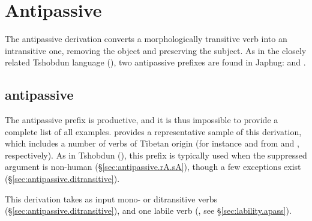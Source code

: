 \section{Antipassive} \label{sec:antipassive}
The antipassive derivation converts a morphologically transitive verb into an intransitive one, removing the object and preserving the subject. As in the closely related Tshobdun language (\citealt[8]{jackson06paisheng}), two antipassive prefixes are found in Japhug:  and .


\subsection{ antipassive} \label{sec:antipassive.rA}
The  antipassive prefix is productive, and it is thus impossible to provide a complete list of all examples.  provides a representative sample of this derivation, which includes a number of verbs of Tibetan origin (for instance  and  from  and , respectively). As in Tshobdun (\citealt[8]{jackson06paisheng}), this prefix is typically used when the suppressed argument is non-human (§\ref{sec:antipassive.rA.sA}), though a few exceptions exist (§\ref{sec:antipassive.ditransitive}). 
 
 This derivation takes as input mono- or ditransitive verbs (§\ref{sec:antipassive.ditransitive}), and one labile verb (, see §\ref{sec:lability.apass}).

